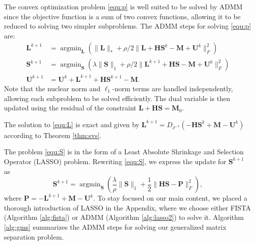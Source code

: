 \documentclass[10pt]{article}  	%
\theoremstyle{definition}
\theoremstyle{definition}
\DeclareMathOperator*{\argmin}{argmin}
\newcommand{\mH}{\mathbf{H}}
\newcommand{\mL}{\mathbf{L}}
\newcommand{\mM}{\mathbf{M}}
\newcommand{\mP}{\mathbf{P}}
\newcommand{\mS}{\mathbf{S}}
\newcommand{\mU}{\mathbf{U}}
\theoremstyle{remark}
\begin{document}
The convex optimization problem \eqref{equ:p} is well suited to be solved by ADMM since the objective function is a sum of two convex functions, allowing it to be reduced to solving two simpler subproblems. 
The ADMM steps for solving \eqref{equ:p} are:
 \begin{align}\label{equ:L}
	 \mL^{k+1} &= \argmin_{\mL} \left(\| \mL\|_* + \rho/2\| \mL+\mH\mS^k- \mM+\mU^k\|_F^2\right)\\ \label{equ:S}
	\mS^{k+1} &= \argmin_{\mS} \left(\lambda \|\mS\|_1+\rho/2\| \mL^{k+1}+\mH\mS- \mM+\mU^k\|_F^2\right) \\ \label{equ:Y}
	\mU^{k+1} &= \mU^k + \mL^{k+1}+\mH\mS^{k+1} - \mM.
\end{align}
Note that the nuclear norm and $\ell_1$-norm terms are handled independently, allowing each subproblem to be solved efficiently.
The dual variable is then updated using the residual of the constraint $\mL + \mH\mS = \mM_0$. 

The solution to \eqref{equ:L} is exact and given by $\mL^{k+1} = D_{\rho^{-1}}(-\mH\mS^k + \mM - \mU^k)$ according to Theorem \ref{thm:svs}.

The problem \eqref{equ:S} is in the form of a Least Absolute Shrinkage and Selection Operator (LASSO) problem. Rewriting \eqref{equ:S}, we express the update for $\mS^{k+1}$ as
\begin{equation}\label{eq:lasso_S}
\mS^{k+1} = \argmin_\mS \left( \frac{\lambda}{\rho} \|\mS\|_1 + \frac{1}{2} \|\mH\mS - \mP\|_F^2 \right),
\end{equation}
where $\mP = -\mL^{k+1} + \mM - \mU^k$. 
To stay focused on our main content, we placed a thorough introduction of LASSO in the Appendix, where we choose 
 either FISTA (Algorithm \ref{alg:fista}) or ADMM (Algorithm \ref{alg:lasso2}) to solve it. 
Algorithm \ref{alg:gms} summarizes the ADMM steps for solving our generalized matrix separation problem.
\end{document}

